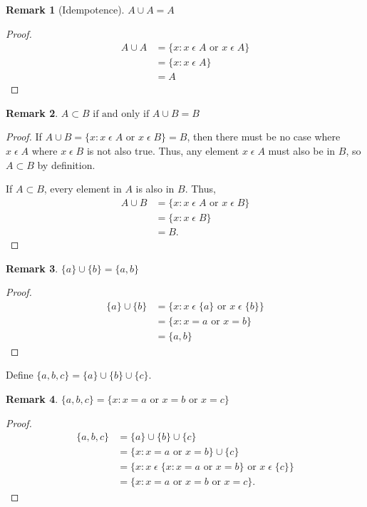 \documentclass[12pt]{article}
\newtheorem{remark}{Remark}
\begin{document}
\begin{remark}[Idempotence]
    $A \cup A = A$
\end{remark}
\begin{proof}
    \begin{align*}
        A \cup A &= \{x: x\;\epsilon\;A \text{ or } x\;\epsilon\;A\}\\
                 &= \{x: x\;\epsilon\;A\}\\\
                 &= A
    \end{align*}
\end{proof}

\begin{remark}
    $A \subset B \text{ if and only if } A \cup B = B$
\end{remark}
\begin{proof}
    If $A \cup B = \{x: x\;\epsilon\;A\text{ or } x\;\epsilon\;B\} = B$, then there must be no case
    where $x\;\epsilon\;A$ where $x\;\epsilon\;B$ is not also true.
    Thus, any element $x\;\epsilon\;A$ must also be in $B$, so $A \subset B$ by definition.

    If $A\subset B$, every element in $A$ is also in $B$. Thus,
    \begin{align*}
        A \cup B &= \{x: x\;\epsilon\;A\text{ or } x\;\epsilon\;B\}\\
                 &= \{x: x\;\epsilon\;B\}\\
                 &= B.
    \end{align*}
\end{proof}

\begin{remark}
    $\{a\} \cup \{b\} = \{a, b\}$
\end{remark}
\begin{proof}
    \begin{align*}
        \{a\} \cup \{b\} &= \{x: x\;\epsilon\;\{a\} \text{ or } x\;\epsilon\;\{b\}\}\\
                         &= \{x: x = a \text{ or } x = b\}\\
                         &=\{a, b\}
    \end{align*}
\end{proof}

Define $\{a, b, c\} = \{a\} \cup \{b\} \cup \{c\}$.

\begin{remark}
    $\{a, b, c\} = \{x: x = a \text{ or } x = b \text{ or } x = c\}$
\end{remark}
\begin{proof}
    \begin{align*}
        \{a, b, c\} &= \{a\} \cup \{b\} \cup \{c\}\\
                    &= \{x: x = a \text{ or } x = b\} \cup \{c\}\\
                    &= \{x: x\;\epsilon\;\{x: x = a \text{ or } x = b\} \text{ or } x\;\epsilon\;\{c\}\}\\
                    &= \{x: x = a \text{ or } x = b \text{ or } x = c\}.
    \end{align*}
\end{proof}
\end{document}
